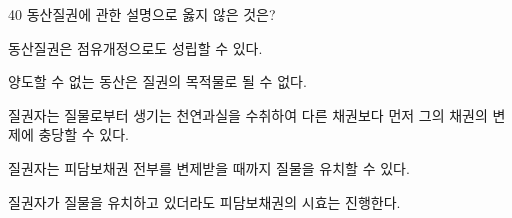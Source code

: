 \begin{question}{40}
동산질권에 관한 설명으로 옳지 않은 것은?
\begin{choices}
  \item 동산질권은 점유개정으로도 성립할 수 있다.
  \item 양도할 수 없는 동산은 질권의 목적물로 될 수 없다.
  \item 질권자는 질물로부터 생기는 천연과실을 수취하여 다른 채권보다 먼저 그의 채권의 변제에 충당할 수 있다.
  \item 질권자는 피담보채권 전부를 변제받을 때까지 질물을 유치할 수 있다.
  \item 질권자가 질물을 유치하고 있더라도 피담보채권의 시효는 진행한다.
\end{choices}
\end{question}
